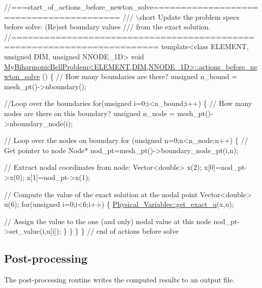  
\begin{DoxyCodeInclude}
\textcolor{comment}{//===start\_of\_actions\_before\_newton\_solve========================================}
\textcolor{comment}{/// \(\backslash\)short Update the problem specs before solve: (Re)set boundary values}
\textcolor{comment}{}\textcolor{comment}{/// from the exact solution. }
\textcolor{comment}{}\textcolor{comment}{//========================================================================}
\textcolor{keyword}{template}<\textcolor{keyword}{class} ELEMENT, \textcolor{keywordtype}{unsigned} DIM, \textcolor{keywordtype}{unsigned} NNODE\_1D>
\textcolor{keywordtype}{void} \hyperlink{classMyBiharmonicBellProblem_acdbf06c4f8cf70ee89cd8f1002da98e8}{MyBiharmonicBellProblem<ELEMENT,DIM,NNODE\_1D>::actions\_before\_newton\_solve}
      ()
\{
 \textcolor{comment}{// How many boundaries are there?}
 \textcolor{keywordtype}{unsigned} n\_bound = mesh\_pt()->nboundary();
 
 \textcolor{comment}{//Loop over the boundaries}
 \textcolor{keywordflow}{for}(\textcolor{keywordtype}{unsigned} i=0;i<n\_bound;i++)
  \{
   \textcolor{comment}{// How many nodes are there on this boundary?}
   \textcolor{keywordtype}{unsigned} n\_node = mesh\_pt()->nboundary\_node(i);

   \textcolor{comment}{// Loop over the nodes on boundary}
   \textcolor{keywordflow}{for} (\textcolor{keywordtype}{unsigned} n=0;n<n\_node;n++)
    \{
     \textcolor{comment}{// Get pointer to node}
     Node* nod\_pt=mesh\_pt()->boundary\_node\_pt(i,n);

     \textcolor{comment}{// Extract nodal coordinates from node:}
     Vector<double> x(2);
     x[0]=nod\_pt->x(0);
     x[1]=nod\_pt->x(1);

     \textcolor{comment}{// Compute the value of the exact solution at the nodal point}
     Vector<double> u(6);
     \textcolor{keywordflow}{for}(\textcolor{keywordtype}{unsigned} i=0;i<6;i++)
      \{
       \hyperlink{namespacePhysical__Variables_af90d0c580c57b1152fd1cc7046055031}{Physical\_Variables::get\_exact\_u}(x,u);
       
       \textcolor{comment}{// Assign the value to the one (and only) nodal value at this node}
       nod\_pt->set\_value(i,u[i]);
      \}
    \}
  \}
\} \textcolor{comment}{// end of actions before solve}

\end{DoxyCodeInclude}




\hypertarget{index_doc}{}\subsection{Post-\/processing}\label{index_doc}
The post-\/processing routine writes the computed results to an output file.


